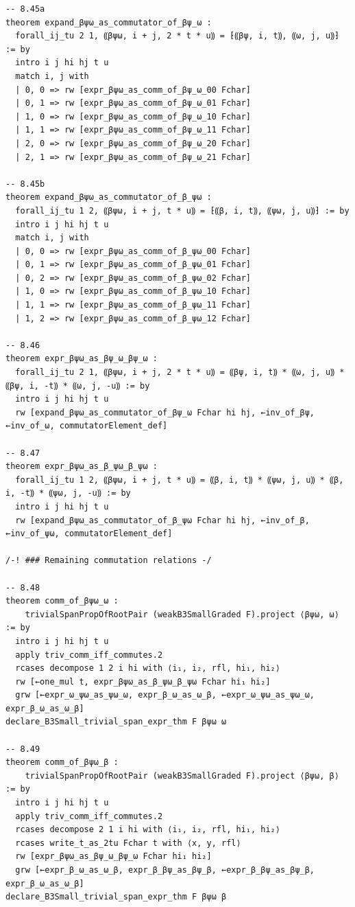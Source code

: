 \documentclass[10pt,a4paper]{article}
\begin{document}
\begin{Verbatim}
-- 8.45a
theorem expand_βψω_as_commutator_of_βψ_ω :
  forall_ij_tu 2 1, ⸨βψω, i + j, 2 * t * u⸩ = ⁅⸨βψ, i, t⸩, ⸨ω, j, u⸩⁆ := by
  intro i j hi hj t u
  match i, j with
  | 0, 0 => rw [expr_βψω_as_comm_of_βψ_ω_00 Fchar]
  | 0, 1 => rw [expr_βψω_as_comm_of_βψ_ω_01 Fchar]
  | 1, 0 => rw [expr_βψω_as_comm_of_βψ_ω_10 Fchar]
  | 1, 1 => rw [expr_βψω_as_comm_of_βψ_ω_11 Fchar]
  | 2, 0 => rw [expr_βψω_as_comm_of_βψ_ω_20 Fchar]
  | 2, 1 => rw [expr_βψω_as_comm_of_βψ_ω_21 Fchar]

-- 8.45b
theorem expand_βψω_as_commutator_of_β_ψω :
  forall_ij_tu 1 2, ⸨βψω, i + j, t * u⸩ = ⁅⸨β, i, t⸩, ⸨ψω, j, u⸩⁆ := by
  intro i j hi hj t u
  match i, j with
  | 0, 0 => rw [expr_βψω_as_comm_of_β_ψω_00 Fchar]
  | 0, 1 => rw [expr_βψω_as_comm_of_β_ψω_01 Fchar]
  | 0, 2 => rw [expr_βψω_as_comm_of_β_ψω_02 Fchar]
  | 1, 0 => rw [expr_βψω_as_comm_of_β_ψω_10 Fchar]
  | 1, 1 => rw [expr_βψω_as_comm_of_β_ψω_11 Fchar]
  | 1, 2 => rw [expr_βψω_as_comm_of_β_ψω_12 Fchar]

-- 8.46
theorem expr_βψω_as_βψ_ω_βψ_ω :
  forall_ij_tu 2 1, ⸨βψω, i + j, 2 * t * u⸩ = ⸨βψ, i, t⸩ * ⸨ω, j, u⸩ * ⸨βψ, i, -t⸩ * ⸨ω, j, -u⸩ := by
  intro i j hi hj t u
  rw [expand_βψω_as_commutator_of_βψ_ω Fchar hi hj, ←inv_of_βψ, ←inv_of_ω, commutatorElement_def]

-- 8.47
theorem expr_βψω_as_β_ψω_β_ψω :
  forall_ij_tu 1 2, ⸨βψω, i + j, t * u⸩ = ⸨β, i, t⸩ * ⸨ψω, j, u⸩ * ⸨β, i, -t⸩ * ⸨ψω, j, -u⸩ := by
  intro i j hi hj t u
  rw [expand_βψω_as_commutator_of_β_ψω Fchar hi hj, ←inv_of_β, ←inv_of_ψω, commutatorElement_def]

/-! ### Remaining commutation relations -/

-- 8.48
theorem comm_of_βψω_ω :
    trivialSpanPropOfRootPair (weakB3SmallGraded F).project ⟨βψω, ω⟩ := by
  intro i j hi hj t u
  apply triv_comm_iff_commutes.2
  rcases decompose 1 2 i hi with ⟨i₁, i₂, rfl, hi₁, hi₂⟩
  rw [←one_mul t, expr_βψω_as_β_ψω_β_ψω Fchar hi₁ hi₂]
  grw [←expr_ω_ψω_as_ψω_ω, expr_β_ω_as_ω_β, ←expr_ω_ψω_as_ψω_ω, expr_β_ω_as_ω_β]
declare_B3Small_trivial_span_expr_thm F βψω ω

-- 8.49
theorem comm_of_βψω_β :
    trivialSpanPropOfRootPair (weakB3SmallGraded F).project ⟨βψω, β⟩ := by
  intro i j hi hj t u
  apply triv_comm_iff_commutes.2
  rcases decompose 2 1 i hi with ⟨i₁, i₂, rfl, hi₁, hi₂⟩
  rcases write_t_as_2tu Fchar t with ⟨x, y, rfl⟩
  rw [expr_βψω_as_βψ_ω_βψ_ω Fchar hi₁ hi₂]
  grw [←expr_β_ω_as_ω_β, expr_β_βψ_as_βψ_β, ←expr_β_βψ_as_βψ_β, expr_β_ω_as_ω_β]
declare_B3Small_trivial_span_expr_thm F βψω β


\end{Verbatim}
\end{document}
